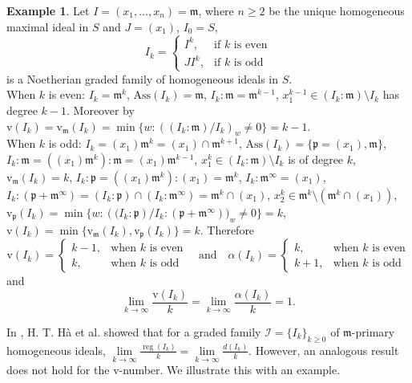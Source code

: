 \documentclass[11pt,reqno,a4paper]{amsart}
\theoremstyle{definition}
\newtheorem{example}[theorem]{Example}
\begin{document}
\begin{example}
 Let  
$I = (x_1,\dots,x_n) = \mathfrak{m}$, where $n\geq2$ be the unique homogeneous maximal ideal in $S$ and $J = (x_1)$, 
$I_0 = S$, 
\[
I_k = 
\begin{cases}
I^k, & \text{if } k \text{ is even} \\
JI^{k}, & \text{if } k \text{ is odd}
\end{cases}
\]
is a Noetherian graded family of homogeneous ideals in $S$.\\
When $k$ is even: 
$I_k = \mathfrak{m}^k$, $\mathrm{Ass}(I_k) = \mathfrak{m}$, 
$I_k : \mathfrak{m} = \mathfrak{m}^{k-1}$, 
$x_1^{k-1} \in (I_k : \mathfrak{m}) \setminus I_k$ has degree $k - 1$. 
Moreover by \cite[Lemma 1.2]{Conca24} $\mathrm{v}(I_k) = \mathrm{v}_{\mathfrak{m}}(I_k) = \min \{ w : \left( (I_k : \mathfrak{m}) / I_k \right)_w \neq 0 \} = k-1$.\\
When $k$ is odd: 
$I_k = (x_1)\mathfrak{m}^{k} = (x_1) \cap \mathfrak{m}^{k+1}$, 
$\mathrm{Ass}(I_k) = \{ \mathfrak{p} = (x_1), \mathfrak{m} \}$, 
$I_k : \mathfrak{m} = ((x_1)\mathfrak{m}^{k}) : \mathfrak{m} = (x_1)\mathfrak{m}^{k-1}$, 
$x_1^{k} \in (I_k : \mathfrak{m}) \setminus I_k$ is of degree $k$, 
$\mathrm{v}_{\mathfrak{m}}(I_k) = k$, 
$I_k : \mathfrak{p} = ((x_1)\mathfrak{m}^{k}) : (x_1) = \mathfrak{m}^{k}$, 
$I_k : \mathfrak{m}^{\infty} = (x_1)$, 
$I_k : (\mathfrak{p} + \mathfrak{m}^{\infty}) = (I_k : \mathfrak{p}) \cap (I_k : \mathfrak{m}^{\infty}) = \mathfrak{m}^{k} \cap (x_1)$, 
$x_2^{k} \in \mathfrak{m}^{k} \setminus (\mathfrak{m}^{k} \cap (x_1))$, 
$\mathrm{v}_{\mathfrak{p}}(I_k) = \min \{ w: \left((I_k:\mathfrak{p}\right) / I_k: (\mathfrak{p} + \mathfrak{m}^{\infty}))_w \neq 0 \} = k$, 
$\mathrm{v}(I_k) = \min \{ \mathrm{v}_{\mathfrak{m}}(I_k), \mathrm{v}_{\mathfrak{p}}(I_k) \} = k$.
Therefore 
\[
\mathrm{v}(I_k) = 
\begin{cases}
k-1, & \text{when } k \text{ is even} \\
k, & \text{when } k \text{ is odd}
\end{cases}
\quad\text{and}\quad
\alpha(I_k) = 
\begin{cases}
k, & \text{when } k \text{ is even} \\
k+1, & \text{when } k \text{ is odd}
\end{cases}
\]
and 
\[
\lim_{k \to \infty} \frac{\mathrm{v}(I_k)}{k} = \lim_{k \to \infty} \frac{\alpha(I_k)}{k} = 1.
\]
\end{example}


In \cite[Theorem 4.1]{HaNguyenNguyen25}, H. T. Hà et al. showed that for a graded family $\mathcal{I} = \{I_k\}_{k \ge 0}$ of $\mathfrak{m}$-primary homogeneous ideals,
\(
\lim\limits_{k \to \infty} \frac{\operatorname{reg}(I_k)}{k} = \lim\limits_{k \to \infty} \frac{d(I_k)}{k}.
\)
However, an analogous result does not hold for the $\mathrm{v}$-number. We illustrate this with an example.
\end{document}
